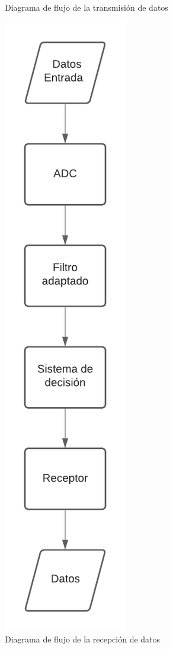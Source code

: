 \begin{figure}[ht]
\begin{minipage}{7cm}
		\caption{\small{Diagrama de flujo de la transmisión de datos}}
		\label{trans}
	  \end{minipage}%
	  \hspace{5mm}
	  \begin{minipage}{7cm}
		\centering
		\includegraphics[scale=0.55]{./figuras/flujo_receptor.pdf}
		\caption{\small{Diagrama de flujo de la recepción de datos}}
		\label{rec}
	  \end{minipage}
\end{figure}

